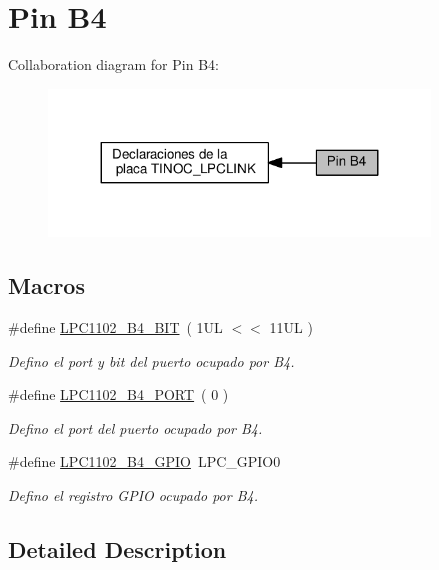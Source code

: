 \hypertarget{group___p_i_n_b4}{}\section{Pin B4}
\label{group___p_i_n_b4}
Collaboration diagram for Pin B4\+:\nopagebreak
\begin{figure}[H]
\begin{center}
\leavevmode
\includegraphics[width=287pt]{group___p_i_n_b4}
\end{center}
\end{figure}
\subsection*{Macros}
\begin{DoxyCompactItemize}
\item 
\#define \hyperlink{group___p_i_n_b4_gabd8ff8e5626973a20825ed09a23f6c6e}{L\+P\+C1102\+\_\+\+B4\+\_\+\+B\+IT}~( 1\+U\+L $<$$<$ 11\+U\+L )
\begin{DoxyCompactList}\small\item\em Defino el port y bit del puerto ocupado por B4. \end{DoxyCompactList}\item 
\#define \hyperlink{group___p_i_n_b4_gaa66d572d746828aa3a56c00b2388aa61}{L\+P\+C1102\+\_\+\+B4\+\_\+\+P\+O\+RT}~( 0 )
\begin{DoxyCompactList}\small\item\em Defino el port del puerto ocupado por B4. \end{DoxyCompactList}\item 
\#define \hyperlink{group___p_i_n_b4_gacbcccf71d8c04a772bba72aeca46284a}{L\+P\+C1102\+\_\+\+B4\+\_\+\+G\+P\+IO}~L\+P\+C\+\_\+\+G\+P\+I\+O0
\begin{DoxyCompactList}\small\item\em Defino el registro G\+P\+IO ocupado por B4. \end{DoxyCompactList}\end{DoxyCompactItemize}


\subsection{Detailed Description}


